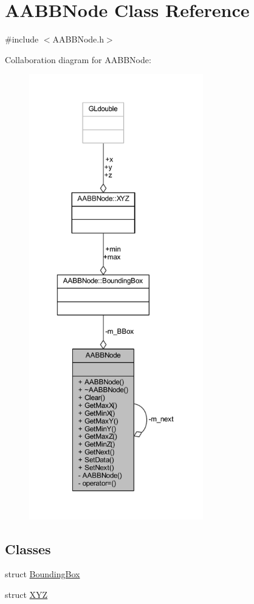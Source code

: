 \hypertarget{class_a_a_b_b_node}{}\section{A\+A\+B\+B\+Node Class Reference}
\label{class_a_a_b_b_node}


{\ttfamily \#include $<$A\+A\+B\+B\+Node.\+h$>$}



Collaboration diagram for A\+A\+B\+B\+Node\+:
\nopagebreak
\begin{figure}[H]
\begin{center}
\leavevmode
\includegraphics[height=550pt]{class_a_a_b_b_node__coll__graph}
\end{center}
\end{figure}
\subsection*{Classes}
\begin{DoxyCompactItemize}
\item 
struct \hyperlink{struct_a_a_b_b_node_1_1_bounding_box}{Bounding\+Box}
\item 
struct \hyperlink{struct_a_a_b_b_node_1_1_x_y_z}{X\+YZ}
\end{DoxyCompactItemize}
